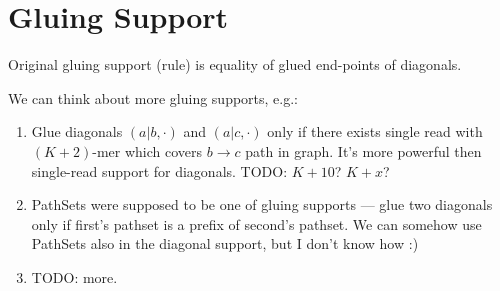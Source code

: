 \documentclass[a4paper]{article}
\begin{document}
\section{Gluing Support}

Original gluing support (rule) is equality of glued end-points of diagonals.

We can think about more gluing supports, e.g.:
\begin{enumerate}
\item Glue diagonals $(a|b, \cdot)$ and $(a|c, \cdot)$ only if there exists single read with $(K+2)$-mer which covers $b \rightarrow c$ path in graph. It's more powerful then single-read support for diagonals. TODO: $K+10$? $K+x$?
\item PathSets were supposed to be one of gluing supports --- glue two diagonals only if first's pathset is a prefix of second's pathset. We can somehow use PathSets also in the diagonal support, but I don't know how :)
\item TODO: more.
\end{enumerate}





\end{document}
